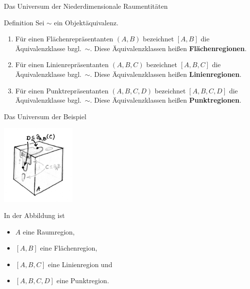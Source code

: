 \documentclass[10pt,xcolor={dvipsnames}]{beamer}
\begin{document}
\begin{frame}{Das Universum der \strukt}{Niederdimensionale Raumentitäten}
    \begin{block}{Definition}
        Sei $\sim$ ein Objektäquivalenz.
        \begin{enumerate}
            \item 
                Für einen Flächenrepräsentanten $(A,B)$ bezeichnet $[A,B]$ die Äquivalenzklasse bzgl.\ $\sim$.
                Diese Äquivalenzklassen heißen \textbf{Flächenregionen}.
            \item 
                Für einen Linienrepräsentanten $(A,B,C)$ bezeichnet $[A,B,C]$ die Äquivalenzklasse bzgl.\ $\sim$.
                Diese Äquivalenzklassen heißen \textbf{Linienregionen}.
            \item 
                Für einen Punktrepräsentanten $(A,B,C,D)$ bezeichnet $[A,B,C,D]$ die Äquivalenzklasse bzgl.\ $\sim$.
                Diese Äquivalenzklassen heißen \textbf{Punktregionen}.
        \end{enumerate}
    \end{block}
\end{frame}


\begin{frame}{Das Universum der \strukt}{Beispiel}
    \parbox{0.3\textwidth}{\includegraphics[height=4cm]{img/eukl-entit_transparent.png}}
    \hfill\mbox{}\hfill
    \parbox{0.6\textwidth}{
    In der Abbildung ist
    \begin{itemize}
        \item $A$ eine Raumregion,
        \item $[A,B]$ eine Flächenregion,
        \item $[A,B,C]$ eine Linienregion und
        \item $[A,B,C,D]$ eine Punktregion.
    \end{itemize}
    }
\end{frame}
\end{document}
